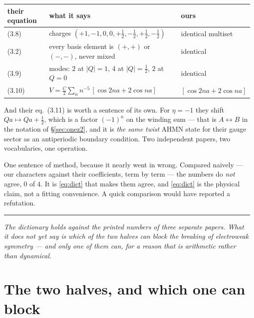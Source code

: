 \documentclass[11pt,a4paper]{article}
\newcommand{\bridge}[1]{\par\medskip\noindent
  \textcolor{hdrblue!45}{\rule{2.2cm}{0.6pt}}\;\;\parbox[t]{0.84\textwidth}{\small\itshape
  \textcolor{hdrblue!85}{#1}}\par\medskip}
\begin{document}
\begin{center}\small
{}
\begin{tabular}{lll}
\toprule
\rowcolor{hdrblue!14}their equation & what it says & ours\\
\midrule
(3.8) & charges $(+1,-1,0,0,+\tfrac12,-\tfrac12,+\tfrac12,-\tfrac12)$ & identical multiset\\
(3.2) & every basis element is $(+,+)$ or $(-,-)$, never mixed & identical\\
(3.9) & modes: $2$ at $|Q|=1$, $4$ at $|Q|=\tfrac12$, $2$ at $Q=0$ & identical\\
(3.10) & $V=\tfrac{C}{2}\sum_n n^{-5}\,[\cos 2na + 2\cos na]$ &
$[\cos 2na + 2\cos na]$\\
\bottomrule
\end{tabular}
\end{center}

\noindent And their eq.~(3.11) is worth a sentence of its own. For $\eta=-1$ they shift
$Qa\mapsto Qa+\tfrac12$, which is a factor $(-1)^n$ on the winding sum --- that is $A\leftrightarrow B$
in the notation of \S\ref{sec:onez2}, and it is \emph{the same twist} AHMN state for their gauge
sector as an antiperiodic boundary condition. Two independent papers, two vocabularies, one operation.

One sentence of method, because it nearly went in wrong. Compared naively --- our characters against
their coefficients, term by term --- the numbers do \emph{not} agree, $0$ of $4$. It is
\eqref{eq:dict} that makes them agree, and \eqref{eq:dict} is the physical claim, not a fitting
convenience. A quick comparison would have reported a refutation.

\bridge{The dictionary holds against the printed numbers of three separate papers. What it does not
yet say is which of the two halves can \emph{block} the breaking of electroweak symmetry --- and only
one of them can, for a reason that is arithmetic rather than dynamical.}

\section{The two halves, and which one can block}\label{sec:halves}
\end{document}
